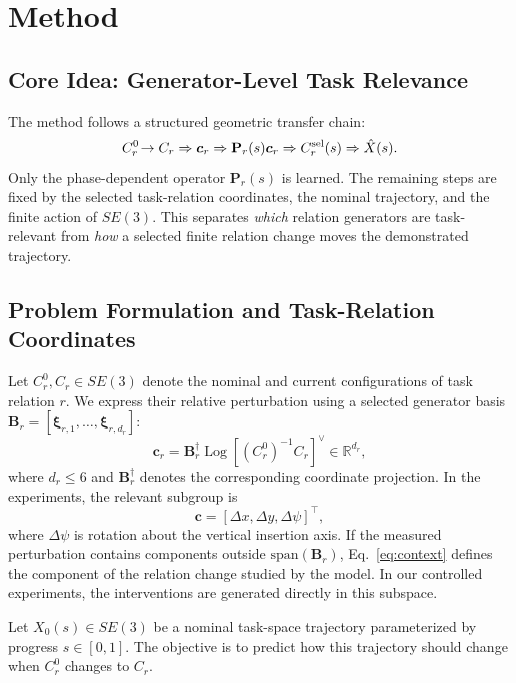 \documentclass[letterpaper,10pt,conference]{ieeeconf}
\DeclareMathOperator{\Log}{Log}
\begin{document}
\section{Method}
\label{sec:method}

\subsection{Core Idea: Generator-Level Task Relevance}
\label{sec:core_idea}

The method follows a structured geometric transfer chain:
\[
C_r^0\!\rightarrow C_r
\Rightarrow \bm c_r
\Rightarrow \mathbf P_r(s)\bm c_r
\Rightarrow C_r^{\rm sel}(s)
\Rightarrow \hat X(s).
\]
Only the phase-dependent operator $\mathbf P_r(s)$ is learned. The remaining
steps are fixed by the selected task-relation coordinates, the nominal
trajectory, and the finite action of $SE(3)$. This separates \emph{which}
relation generators are task-relevant from \emph{how} a selected finite relation
change moves the demonstrated trajectory.

\subsection{Problem Formulation and Task-Relation Coordinates}
\label{sec:problem_formulation}

Let $C_r^0,C_r\in SE(3)$ denote the nominal and current configurations of task
relation $r$. We express their relative perturbation using a selected generator
basis $\mathbf B_r=[\bm\xi_{r,1},\ldots,\bm\xi_{r,d_r}]$:
\begin{equation}
    \bm c_r =
    \mathbf B_r^{\dagger}
    \Log\!\left[(C_r^0)^{-1}C_r\right]^\vee
    \in\mathbb R^{d_r},
    \label{eq:context}
\end{equation}
where $d_r\leq6$ and $\mathbf B_r^\dagger$ denotes the corresponding coordinate
projection. In the experiments, the relevant subgroup is
\begin{equation}
    \bm c=[\Delta x,\Delta y,\Delta\psi]^\top,
\end{equation}
where $\Delta\psi$ is rotation about the vertical insertion axis.
If the measured perturbation contains components outside
$\mathrm{span}(\mathbf B_r)$, Eq.~\eqref{eq:context} defines the component of
the relation change studied by the model. In our controlled experiments, the
interventions are generated directly in this subspace.

Let $X_0(s)\in SE(3)$ be a nominal task-space trajectory parameterized by
progress $s\in[0,1]$. The objective is to predict how this trajectory should
change when $C_r^0$ changes to $C_r$.
\end{document}
